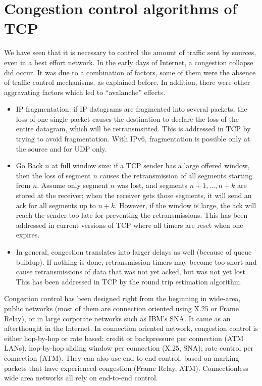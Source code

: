 \section{Congestion control algorithms of TCP}

We have seen that it is necessary to control the amount of traffic
sent by sources, even in a best effort network.
In the early days of Internet, a congestion collapse did occur. It was
due to a combination of factors, some of them were the absence of
traffic control mechanisms, as explained before. In addition, there
were other aggravating factors which led to ``avalanche'' effects.

\begin{itemize}
\item IP fragmentation: if IP datagrams are fragmented into several
packets, the loss of one single packet causes the destination to
declare the loss of the entire datagram, which will be
retransmsitted. This is addressed in TCP by trying to avoid
fragmentation. With IPv6, fragmentation is possible only at the source
and for UDP only.
\item Go Back $n$ at full window size: if a TCP sender has a large
offered window, then the loss of segment $n$ causes the retransmission
of all segments starting from $n$.  Assume only segment $n$ was lost,
and segments $n+1,\ldots, n+k$ are stored at the receiver; when the
receiver gets those segments, it will send an ack for all segments up
to $n+k$.  However, if the window is large, the ack will reach the
sender too late for preventing the retransmissions.  This has been
addressed in current versions of TCP where all timers are reset when
one expires.
\item In general, congestion translates into larger
delays as well (because of queue buildup). If nothing is done,
retransmission timers may become too short and cause retransmissions
of data that was not yet acked, but was not yet lost.
This has been addressed in TCP by the round trip estimation algorithm.
\end{itemize}

Congestion control has been designed right from the beginning in wide-area,
public networks (most of them are connection oriented using
X.25 or Frame Relay), or in large corporate networks such as IBM's SNA. It
came as an afterthought in the Internet.  In connection oriented
network, congestion control is either hop-by-hop or rate
based: credit or
backpressure per connection (ATM LANs), hop-by-hop sliding window per
connection (X.25, SNA); rate control per connection (ATM).
They can also use end-to-end control,
based on marking packets that have experienced congestion
(Frame Relay, ATM). Connectionless wide area networks all rely
 on end-to-end control.

